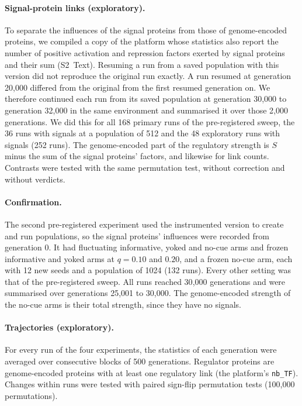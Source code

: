 \documentclass[10pt,letterpaper]{article}
\begin{document}
\paragraph*{Signal-protein links (exploratory).} To separate the influences of the
signal proteins from those of genome-encoded proteins, we compiled a copy of the
platform whose statistics also report the number of positive activation and
repression factors exerted by signal proteins and their sum (S2~Text). Resuming a
run from a saved population with this version did not reproduce the original run
exactly. A run resumed at generation 20{,}000 differed from the original from the
first resumed generation on. We therefore continued each run from its saved
population at generation 30{,}000 to generation 32{,}000 in the same environment
and summarised it over those 2{,}000 generations. We did this for all 168 primary
runs of the pre-registered sweep, the 36 runs with signals at a population of 512
and the 48 exploratory runs with signals (252 runs). The genome-encoded part of
the regulatory strength is $S$ minus the sum of the signal proteins' factors, and
likewise for link counts. Contrasts were tested with the same permutation test,
without correction and without verdicts.

\paragraph*{Confirmation.} The second pre-registered experiment used the
instrumented version to create and run populations, so the signal proteins'
influences were recorded from generation 0. It had fluctuating informative,
yoked and no-cue arms and frozen informative and yoked arms at $q=0.10$ and
$0.20$, and a frozen no-cue arm, each with 12 new seeds and a population of 1024
(132 runs). Every other setting was that of the pre-registered sweep. All runs
reached 30{,}000 generations and were summarised over generations 25{,}001 to
30{,}000. The genome-encoded strength of the no-cue arms is their total strength,
since they have no signals.

\paragraph*{Trajectories (exploratory).} For every run of the four experiments,
the statistics of each generation were averaged over consecutive blocks of 500
generations. Regulator proteins are genome-encoded proteins with at least one
regulatory link (the platform's \texttt{nb\_TF}). Changes within runs were
tested with paired sign-flip permutation tests (100{,}000 permutations).
\end{document}
